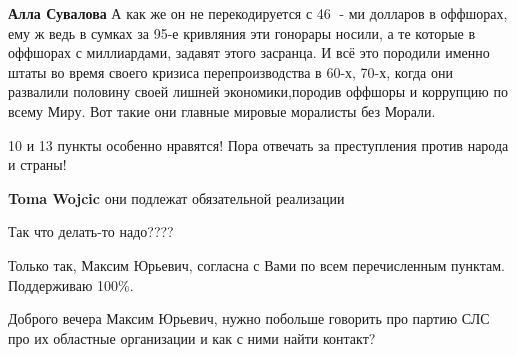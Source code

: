 \begin{itemize}
\begin{itemize}
\textbf{Алла Сувалова} А как же он не перекодируется с 46 🍋- ми долларов в
оффшорах, ему ж ведь в сумках за 95-е кривляния эти гонорары носили, а те
которые в оффшорах с миллиардами, задавят этого засранца. И всё это породили
именно штаты во время своего кризиса перепроизводства в 60-х, 70-х, когда они
развалили половину своей лишней экономики,породив оффшоры и коррупцию по всему
Миру. Вот такие они главные мировые моралисты без Морали.
\end{itemize}

 
10 и 13 пункты особенно нравятся! Пора отвечать за преступления против народа и страны!

\begin{itemize}
 
\textbf{Toma Wojcic} они подлежат обязательной реализации
\end{itemize}

 
Так что делать-то надо????

 
Только так, Максим Юрьевич, согласна с Вами по всем перечисленным пунктам. Поддерживаю 100\%.

 
Доброго вечера Максим Юрьевич, нужно побольше говорить про партию СЛС про их областные организации и как с ними найти контакт?


\end{itemize}
